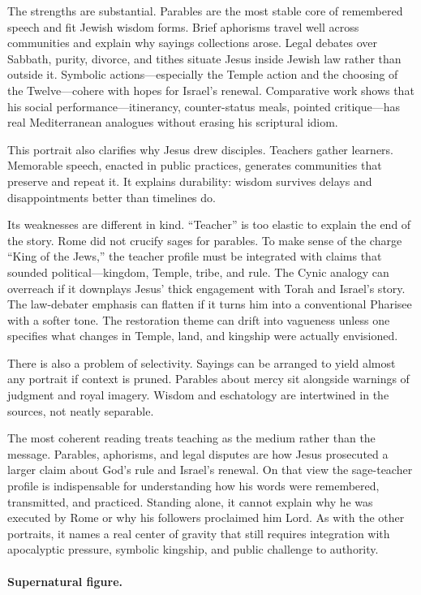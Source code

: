 The strengths are substantial.
Parables are the most stable core of remembered speech and fit Jewish wisdom forms.
Brief aphorisms travel well across communities and explain why sayings collections arose.
Legal debates over Sabbath, purity, divorce, and tithes situate Jesus inside Jewish law rather than outside it.
Symbolic actions—especially the Temple action and the choosing of the Twelve—cohere with hopes for Israel’s renewal.
Comparative work shows that his social performance—itinerancy, counter-status meals, pointed critique—has real Mediterranean analogues without erasing his scriptural idiom.

This portrait also clarifies why Jesus drew disciples.
Teachers gather learners.
Memorable speech, enacted in public practices, generates communities that preserve and repeat it.
It explains durability: wisdom survives delays and disappointments better than timelines do.

Its weaknesses are different in kind.
“Teacher” is too elastic to explain the end of the story.
Rome did not crucify sages for parables.
To make sense of the charge “King of the Jews,” the teacher profile must be integrated with claims that sounded political—kingdom, Temple, tribe, and rule.
The Cynic analogy can overreach if it downplays Jesus’ thick engagement with Torah and Israel’s story.
The law-debater emphasis can flatten if it turns him into a conventional Pharisee with a softer tone.
The restoration theme can drift into vagueness unless one specifies what changes in Temple, land, and kingship were actually envisioned.

There is also a problem of selectivity.
Sayings can be arranged to yield almost any portrait if context is pruned.
Parables about mercy sit alongside warnings of judgment and royal imagery.
Wisdom and eschatology are intertwined in the sources, not neatly separable.

The most coherent reading treats teaching as the medium rather than the message.
Parables, aphorisms, and legal disputes are how Jesus prosecuted a larger claim about God’s rule and Israel’s renewal.
On that view the sage-teacher profile is indispensable for understanding how his words were remembered, transmitted, and practiced.
Standing alone, it cannot explain why he was executed by Rome or why his followers proclaimed him Lord.
As with the other portraits, it names a real center of gravity that still requires integration with apocalyptic pressure, symbolic kingship, and public challenge to authority.

\paragraph{Supernatural figure.}

